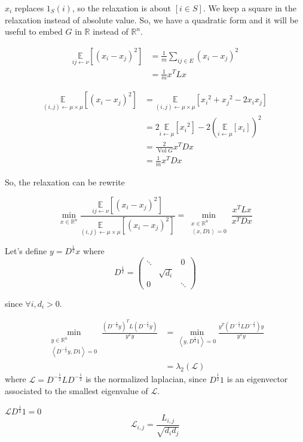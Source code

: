 \documentclass[12pt]{article}
\newcommand{\EE}{\mathbb{E}}
\newcommand{\RR}{\mathbb{R}}
\renewcommand{\L}{\mathcal{L}}
\renewcommand{\angle}[1]{\left\langle #1 \right\rangle}
\newcommand{\la}{\leftarrow}
\newcommand{\esp}[2][]{\underset{#1}{\EE}\left[ #2 \right]}
\DeclareMathOperator{\vol}{Vol}
\begin{document}
$x_i$ replaces $1_S(i)$, so the relaxation is about $[i\in S]$. We keep a square in the relaxation instead of absolute value. So, we have a quadratic form and it will be useful to embed $G$ in $\RR$ instead of $\RR^n$.

\[
    \begin{aligned}
        \esp[ij\la\nu]{(x_i-x_j)^2} &= \frac{1}{m} \sum\limits_{ij\in E} (x_i-x_j)^2\\
        &= \frac{1}{m} x^T L x
    \end{aligned}
\]

\[
    \begin{aligned}
        \esp[(i,j) \la \mu\times\mu]{(x_i-x_j)^2} &= \esp[(i,j)\la\mu\times\mu]{{x_i}^2+{x_j}^2-2x_ix_j}\\
        &= 2\esp[i\la \mu]{{x_i}^2} - 2\left( \esp[i\la \mu]{x_i}\right)^2\\
        &= \frac{2}{\vol G} x^T D x\\
        &= \frac{1}{m} x^T D x
    \end{aligned}
\]

So, the relaxation can be rewrite

\[
    \min\limits_{x\in\RR^n} \frac{\esp[ij\la\nu]{(x_i-x_j)^{2}}}{\esp[(i,j)\la\mu\times\mu]{(x_i-x_j)^2}} = \min\limits_{\substack{x\in\RR^n\\\angle{x,D1}=0}} \frac{x^TLx}{x^TDx}
\]


Let's define $y = D^{\frac{1}{2}} x$ where 
\[
    D^{\frac{1}{2}} = \left(\begin{matrix}
         \ddots&&0 \\
         & \sqrt{d_i}\\
         0&&\ddots
    \end{matrix}\right)
\]

since $\forall i, d_i >0$.

\[
    \begin{aligned}
        \min\limits_{\substack{y\in\RR^n\\\angle{D^{- \frac{1}{2}}y,D1}=0}} \frac{(D^{-\frac{1}{2}} y)^T L (D^{-\frac{1}{2}}y)}{y^Ty} &= \min\limits_{\angle{y, D^{\frac{1}{2}}1}=0} \frac{y^T(D^{-\frac{1}{2}}LD^{-\frac{1}{2}})y}{y^T y}\\
        &= \lambda_2 (\L)
    \end{aligned}
\]
where $\L = D^{-\frac{1}{2}} L D^{-\frac{1}{2}}$ is the normalized laplacian, since $D^{\frac{1}{2}}1$ is an eigenvector associated to the smallest eigenvalue of $\L$.

$\L D^{\frac{1}{2}} 1 =0$
\[
    \boxed{\L_{i,j} = \frac{L_{i,j}}{\sqrt{d_id_j}}}
\]
\end{document}
